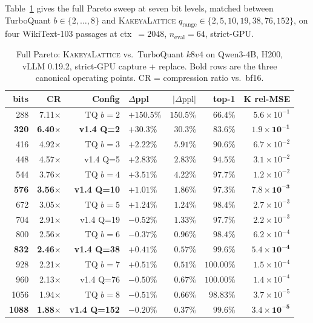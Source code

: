 \documentclass[11pt,a4paper]{article}
\theoremstyle{definition}
\theoremstyle{plain}
\newcommand{\abs}[1]{\left\lvert#1\right\rvert}
\begin{document}
Table~\ref{tab:pareto-qwen3} gives the full Pareto sweep at seven
bit levels, matched between TurboQuant $b\in\{2,\ldots,8\}$ and
\textsc{KakeyaLattice} $q_\mathrm{range}\in\{2,5,10,19,38,76,152\}$,
on four WikiText-103 passages at ctx~$=\!2048$, $n_\mathrm{eval}=64$,
strict-GPU.

\begin{table}[H]
\centering
\small
\caption{Full Pareto: \textsc{KakeyaLattice} vs.\ TurboQuant $k8v4$
on Qwen3-4B, H200, vLLM 0.19.2, strict-GPU capture + replace. Bold
rows are the three canonical operating points. CR = compression
ratio vs.\ bf16.}
\label{tab:pareto-qwen3}
\begin{tabular}{rrrlrrr}
  \toprule
  bits & CR & Config & $\Delta$ppl & $\abs{\Delta\text{ppl}}$ & top-1 & K rel-MSE \\
  \midrule
   288 & 7.11$\times$ & TQ $b=2$    & $+150.5\%$ & $150.5\%$ & $66.4\%$ & $5.6\times10^{-1}$ \\
   \textbf{320} & \textbf{6.40}$\times$ & \textbf{v1.4 Q=2}   & $+30.3\%$  & $30.3\%$  & $\mathbf{83.6\%}$ & $\mathbf{1.9\times10^{-1}}$ \\
   416 & 4.92$\times$ & TQ $b=3$    & $+2.22\%$  & $5.91\%$  & $90.6\%$ & $6.7\times10^{-2}$ \\
   448 & 4.57$\times$ & v1.4 Q=5    & $+2.83\%$  & $2.83\%$  & $94.5\%$ & $3.1\times10^{-2}$ \\
   544 & 3.76$\times$ & TQ $b=4$    & $+3.51\%$  & $4.22\%$  & $97.7\%$ & $1.2\times10^{-2}$ \\
   \textbf{576} & \textbf{3.56}$\times$ & \textbf{v1.4 Q=10}  & $+1.01\%$  & $1.86\%$  & $97.3\%$ & $\mathbf{7.8\times10^{-3}}$ \\
   672 & 3.05$\times$ & TQ $b=5$    & $+1.24\%$  & $1.24\%$  & $98.4\%$ & $2.7\times10^{-3}$ \\
   704 & 2.91$\times$ & v1.4 Q=19   & $-0.52\%$  & $1.33\%$  & $97.7\%$ & $2.2\times10^{-3}$ \\
   800 & 2.56$\times$ & TQ $b=6$    & $-0.37\%$  & $0.96\%$  & $98.4\%$ & $6.2\times10^{-4}$ \\
   \textbf{832} & \textbf{2.46}$\times$ & \textbf{v1.4 Q=38}  & $+0.41\%$  & $0.57\%$  & $\mathbf{99.6\%}$ & $\mathbf{5.4\times10^{-4}}$ \\
   928 & 2.21$\times$ & TQ $b=7$    & $+0.51\%$  & $0.51\%$  & $100.00\%$ & $1.5\times10^{-4}$ \\
   960 & 2.13$\times$ & v1.4 Q=76   & $-0.50\%$  & $0.67\%$  & $100.00\%$ & $1.4\times10^{-4}$ \\
  1056 & 1.94$\times$ & TQ $b=8$    & $-0.51\%$  & $0.66\%$  & $98.83\%$ & $3.7\times10^{-5}$ \\
  \textbf{1088} & \textbf{1.88}$\times$ & \textbf{v1.4 Q=152} & $-0.20\%$  & $0.37\%$  & $\mathbf{99.6\%}$ & $\mathbf{3.4\times10^{-5}}$ \\
  \bottomrule
\end{tabular}
\end{table}
\end{document}
